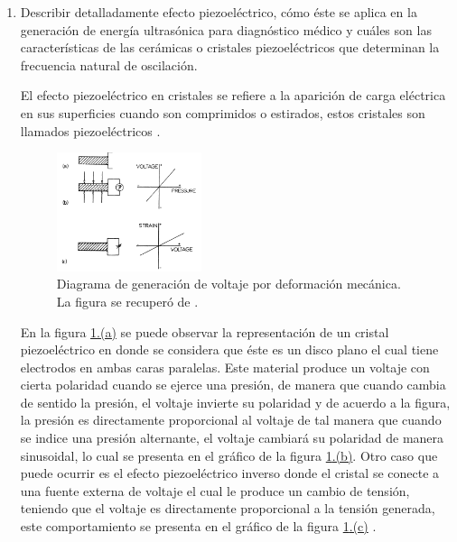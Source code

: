 \newlength{\strutheight}
\settoheight{\strutheight}{\strut}
\begin{enumerate}
  \item Describir detalladamente efecto piezoeléctrico, cómo éste se aplica en la generación de energía ultrasónica para diagnóstico médico y cuáles son las características de las cerámicas o cristales piezoeléctricos que determinan la frecuencia natural de oscilación.
  
  El efecto piezoeléctrico en cristales se refiere a la aparición de carga eléctrica en sus superficies cuando son comprimidos o estirados, estos cristales son llamados piezoeléctricos \citep{WHO}.
    
    \begin{adjustbox}{valign=T,raise=\strutheight,minipage={\linewidth}}
      \begin{figure}
        \centering
        \captionsetup{margin=5pt}
        \includegraphics[width=0.4\textwidth]{./figuras/p1_0.pdf}
        \caption{Diagrama de generación de voltaje por deformación mecánica. La figura se recuperó de \citet{matthew}.}
        \label{p1:0}
      \end{figure}
    \strut{}  
    
    En la figura \hyperref[p1:0]{\ref{p1:0}.(a)} se puede observar la representación de un cristal piezoeléctrico en donde se considera que éste es un disco plano el cual tiene electrodos en ambas caras paralelas. Este material produce un voltaje con cierta polaridad cuando se ejerce una presión, de manera que cuando cambia de sentido la presión, el voltaje invierte su polaridad y de acuerdo a la figura, la presión es directamente proporcional al voltaje de tal manera que cuando se indice una presión alternante, el voltaje cambiará su polaridad de manera sinusoidal, lo cual se presenta en el gráfico de la figura \hyperref[p1:0]{\ref{p1:0}.(b)}. Otro caso que puede ocurrir es el efecto piezoeléctrico inverso donde el cristal se conecte a una fuente externa de voltaje el cual le produce un cambio de tensión, teniendo que el voltaje es directamente proporcional a la tensión generada, este comportamiento se presenta en el gráfico de la figura \hyperref[p1:0]{\ref{p1:0}.(c)} \citep{matthew}. 




\end{adjustbox}
\end{enumerate}
